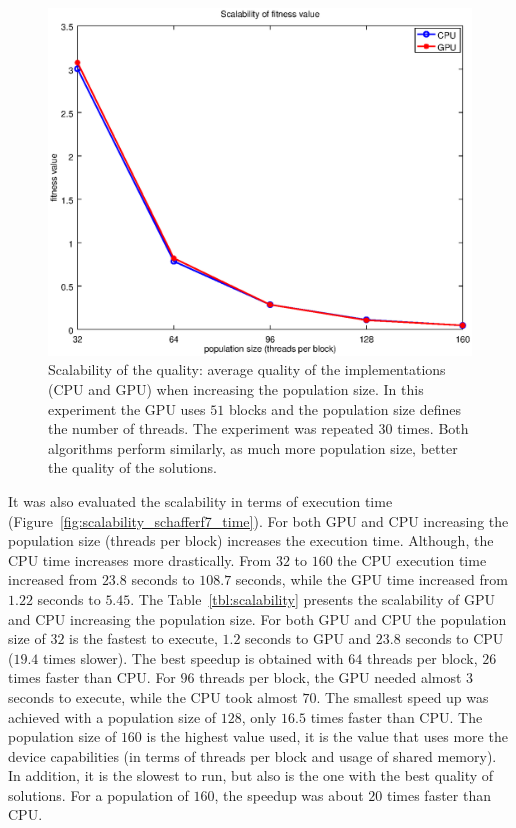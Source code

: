 \documentclass[conference]{IEEEtran}
\begin{document}
    \begin{figure}[!htb]
        \centering
        \includegraphics[width=\columnwidth]{../img/scalability_schafferf7.eps}
        \caption{Scalability of the quality: average quality of the implementations (CPU and GPU) when increasing the population size. In this experiment the GPU uses $51$ blocks and the population size defines the number of threads. The experiment was repeated $30$ times. Both algorithms perform similarly, as much more population size, better the quality of the solutions.}
        \label{fig:scalability_schafferf7}
    \end{figure}

    It was also evaluated the scalability in terms of execution time (Figure~\ref{fig:scalability_schafferf7_time}).
    For both GPU and CPU increasing the population size (threads per block) increases the execution time.
    Although, the CPU time increases more drastically. From $32$ to $160$ the CPU execution time increased from $23.8$ seconds to $108.7$ seconds, while the GPU time increased from $1.22$ seconds to $5.45$. The Table~\ref{tbl:scalability} presents the scalability of GPU and CPU increasing the population size. For both GPU and CPU the population size of $32$ is the fastest to execute, $1.2$ seconds to GPU and $23.8$ seconds to CPU ($19.4$ times slower). The best speedup is obtained with $64$ threads per block, $26$ times faster than CPU. For $96$ threads per block, the GPU needed almost $3$ seconds to execute, while the CPU took almost $70$. The smallest speed up was achieved with a population size of $128$, only $16.5$ times faster than CPU. The population size of $160$ is the highest value used, it is the value that uses more the device capabilities (in terms of threads per block and usage of shared memory). In addition, it is the slowest to run, but also is the one with the best quality of solutions. For a population of $160$, the speedup was about $20$ times faster than CPU.
\end{document}
